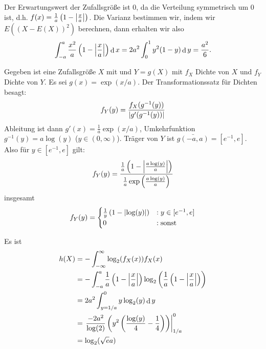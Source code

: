 \documentclass{article}
\begin{document}
\begin{solution}
    \begin{tasks}
            \item Der Erwartungswert der Zufallsgröße ist $0$, da die Verteilung symmetrisch um $0$ ist, d.h. $f(x)=\frac 1 a\left(1-\left|\frac x a\right|\right)$. Die Varianz bestimmen wir, indem wir $E({(X-E(X))}^2)$ berechnen, dann erhalten wir also
        $$
        \int_{-a}^a{\frac {x^2} a\left(1-\left|\frac x a\right|\right)}\mathop\mathrm{d} x = 2a^2\int_0^1{y^2(1-y)}\mathop\mathrm{d} y =\frac {a^2} 6. 
        $$
            \item Gegeben ist eine Zufallsgröße $X$ mit und $Y=g(X)$ mit $f_X$ Dichte von $X$ und $f_Y$ Dichte von $Y$. Es sei $g(x)=\exp(x/a)$. Der Transformationssatz für Dichten besagt:
        $$
        f_Y(y)=\frac{f_X(g^{-1}(y))}{\left|g'(g^{-1}(y))\right|}
        $$
        Ableitung ist dann $g'(x)=\frac 1 a \exp(x/a)$, Umkehrfunktion $g^{-1}(y)=a\log(y)$ ($y\in (0,\infty)$). Träger von $Y$ ist $\bar{g(-a,a)}=[e^{-1},e]$. Also für $y\in[e^{-1},e]$ gilt:
        $$
        f_Y(y)=\frac{\frac 1 a\left(1-\left|\frac{a\log(y)}{a}\right|\right)}{\frac 1 a\exp\left(\frac{a\log(y)}{a}\right)}
        $$
        insgesamt
        $$
        f_Y(y)=
        \begin{cases}
            \frac 1 y\left(1-\left|\log(y)\right|\right) &: y\in [e^{-1},e]\\
            0 &: \text{sonst}
        \end{cases}
        $$
            \item Es ist
        \begin{align*}
            h(X) &
            =-\int_{-\infty}^\infty{\log_2(f_X(x))f_X(x)}\\
            &
            = -\int_{-a}^a{\frac 1 a\left(1-\left|\frac x a\right|\right)\log_2\left(\frac 1 a\left(1-\left|\frac x a\right|\right)\right)}\\
            &
            = 2a^2\int_{y=1/a}^0{y\log_2(y)}\mathop\mathrm{d} y\\
            &
            = \left. \frac{-2a^2}{\log(2)}\left(y^2\left(\frac{\log(y)}{4}-\frac 1 4\right)\right)\right\vert_{1/a}^0\\
            & = \log_2(\sqrt e a)
        \end{align*}
    \end{tasks}
\end{solution}
\end{document}
